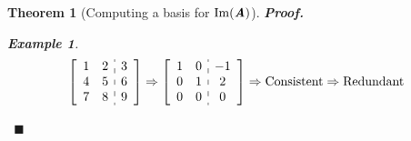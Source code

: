 \documentclass[12pt, a4paper]{article}
\newtheorem{thm}{Theorem}[subsection]
\newtheorem{eg}{Example}[subsection]
\newenvironment*{prf}{\indent\textbf{\textit{Proof. }}}{\hfill $\blacksquare$\par}
\def\IM{{\mathrm{Im}}}
\def\matrixA{\textbf{\emph{A}}}
\begin{document}
\begin{thm}[Computing a basis for $\IM(\matrixA)$]
\begin{prf}
\begin{eg}
			\[\left[\begin{array}{c:c}\begin{matrix}1&2\\4&5\\7&8\end{matrix}&\begin{matrix}3\\6\\9\end{matrix}\end{array}\right]\Rightarrow\left[\begin{array}{c:c}\begin{matrix}1&0\\0&1\\0&0\end{matrix}&\begin{matrix}-1\\2\\0\end{matrix}\end{array}\right]\Rightarrow\text{Consistent}\Rightarrow\text{Redundant}\]
		\end{eg}\
	\end{prf}
\end{thm}
\end{document}
